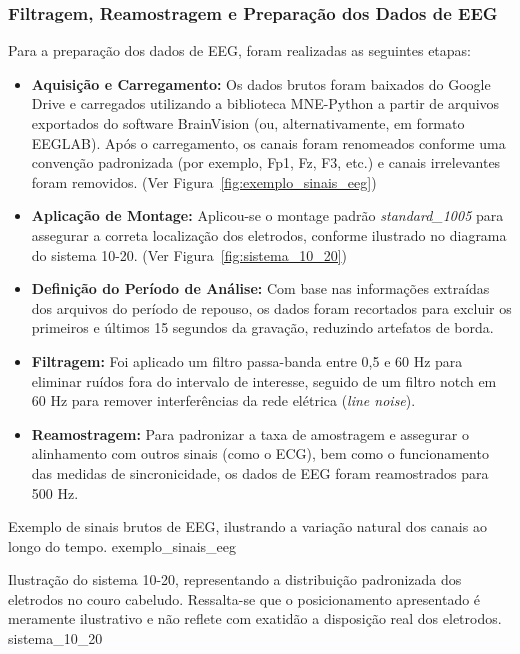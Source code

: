 \subsubsection{Filtragem, Reamostragem e Preparação dos Dados de EEG}
Para a preparação dos dados de EEG, foram realizadas as seguintes etapas:
\begin{itemize}
    \item \textbf{Aquisição e Carregamento:} Os dados brutos foram baixados do Google Drive e carregados utilizando a biblioteca MNE-Python a partir de arquivos exportados do software BrainVision (ou, alternativamente, em formato EEGLAB). Após o carregamento, os canais foram renomeados conforme uma convenção padronizada (por exemplo, Fp1, Fz, F3, etc.) e canais irrelevantes foram removidos. (Ver Figura~\ref{fig:exemplo_sinais_eeg})
    \item \textbf{Aplicação de Montage:} Aplicou-se o montage padrão \textit{standard\_1005} para assegurar a correta localização dos eletrodos, conforme ilustrado no diagrama do sistema 10-20. (Ver Figura~\ref{fig:sistema_10_20})
    \item \textbf{Definição do Período de Análise:} Com base nas informações extraídas dos arquivos do período de repouso, os dados foram recortados para excluir os primeiros e últimos 15 segundos da gravação, reduzindo artefatos de borda.
    \item \textbf{Filtragem:} Foi aplicado um filtro passa-banda entre 0,5 e 60 Hz para eliminar ruídos fora do intervalo de interesse, seguido de um filtro notch em 60 Hz para remover interferências da rede elétrica (\textit{line noise}).
    \item \textbf{Reamostragem:} Para padronizar a taxa de amostragem e assegurar o alinhamento com outros sinais (como o ECG), bem como o funcionamento das medidas de sincronicidade, os dados de EEG foram reamostrados para 500 Hz.
\end{itemize}

{Exemplo de sinais brutos de EEG, ilustrando a variação natural dos canais ao longo do tempo.}
{exemplo_sinais_eeg}

{Ilustração do sistema 10-20, representando a distribuição padronizada dos eletrodos no couro cabeludo. Ressalta-se que o posicionamento apresentado é meramente ilustrativo e não reflete com exatidão a disposição real dos eletrodos.}
{sistema_10_20}



